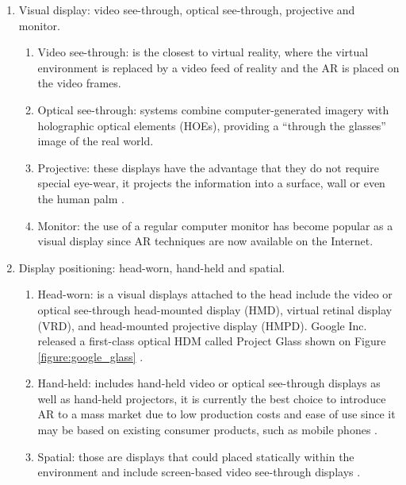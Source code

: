 \begin{enumerate}
  \item Visual display: video see-through, optical see-through, projective and monitor.
    \begin{enumerate}
      \item Video see-through: is the closest to virtual reality, where the virtual environment is replaced by a video feed of reality and the AR is placed on the video frames.
      \item Optical see-through: systems combine computer-generated imagery with holographic optical elements (HOEs), providing a ``through the glasses'' image of the real world.
      \item Projective: these displays have the advantage that they do not require special eye-wear, it projects the information into a surface, wall or even the human palm \cite{Benford1998}.
      \item Monitor: the use of a regular computer monitor has become popular as a visual display since AR techniques are now available on the Internet.
    \end{enumerate}

  \item Display positioning: head-worn, hand-held and spatial.
    \begin{enumerate}
      \item Head-worn: is a visual displays attached to the head include the video or optical see-through head-mounted display (HMD), virtual retinal display (VRD), and head-mounted projective display (HMPD). Google Inc. released a first-class optical HDM called Project Glass shown on Figure \ref{figure:google_glass} \cite{Glass2013}.
      \item Hand-held: includes hand-held video or optical see-through displays as well as hand-held projectors, it is currently the best choice to introduce AR to a mass market due to low production costs and ease of use since it may be based on existing consumer products, such as mobile phones \cite{Benford1998}.
      \item Spatial: those are displays that could placed statically within the environment and include screen-based video see-through displays \cite{Benford1998}.
    \end{enumerate}
\end{enumerate}

